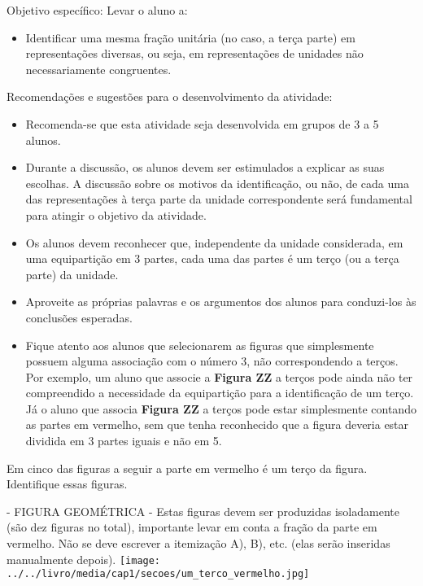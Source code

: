 \documentclass[a4paper,12pt,twoside]{book}
\begin{document}
\begin{professor*}[breakable]{}{}     
  Objetivo específico: Levar o aluno a:  
  
\begin{itemize} %
    \item       Identificar uma mesma fração unitária (no caso, a terça parte) em representações diversas, ou seja, em representações de unidades não necessariamente congruentes.
\end{itemize} %
  
     
  
  Recomendações e sugestões para o desenvolvimento da atividade:  
\begin{itemize} %
    \item       Recomenda-se que esta atividade seja desenvolvida em grupos de 3 a 5 alunos.
    \item       Durante a discussão, os alunos devem ser estimulados a explicar as suas escolhas. A discussão sobre os motivos da identificação, ou não, de cada uma das representações à terça parte da unidade correspondente será fundamental para atingir o objetivo da atividade.
    \item       Os alunos devem reconhecer que, independente da unidade considerada, em uma equipartição em 3 partes, cada uma das partes é um terço (ou a terça parte) da unidade.
    \item       Aproveite as próprias palavras e os argumentos dos alunos para conduzi-los às conclusões esperadas.
    \item       Fique atento aos alunos que selecionarem as figuras que simplesmente possuem alguma associação com o número 3, não correspondendo a terços. Por exemplo, um aluno que associe a       {\bf Figura ZZ}       a terços pode ainda não ter compreendido a necessidade da equipartição para a identificação de um terço. Já o aluno que associa       {\bf Figura ZZ}       a terços pode estar simplesmente contando as partes em vermelho, sem que tenha reconhecido que a figura deveria estar dividida em 3 partes iguais e não em 5. 
\end{itemize} %
  
\end{professor*}



Em cinco das figuras a seguir a parte em vermelho é um terço da figura. Identifique essas figuras.
\begin{imagem*}[breakable]{}{}   - FIGURA GEOMÉTRICA - Estas figuras devem ser produzidas isoladamente (são dez figuras no total), importante levar em conta a fração da parte em vermelho. Não se deve escrever a itemização A), B), etc. (elas serão inseridas manualmente depois).  
    \texttt{[image: ../../livro/media/cap1/secoes/um\_terco\_vermelho.jpg]}  
\end{imagem*}
\end{document}
